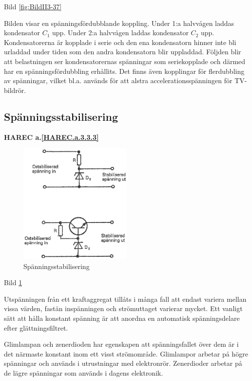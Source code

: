 Bild \ref{fig:BildII3-37}

Bilden visar en spänningsfördubblande koppling. Under 1:a halvvågen
laddas kondensator \(C_1\) upp. Under 2:a halvvågen laddas kondensator
\(C_2\) upp. Kondensatorerna är kopplade i serie och den ena
kondensatorn hinner inte bli urladdad under tiden som den andra
kondensatorn blir uppladdad. Följden blir att belastningen ser
kondensatorernas spänningar som seriekopplade och därmed har en
spänningsfördubbling erhållits. Det finns även kopplingar för
flerdubbling av spänningar, vilket bl.a. används för att alstra
accelerationsspänningen för TV-bildrör.

\subsection{Spänningsstabilisering}
\textbf{HAREC a.\ref{HAREC.a.3.3.3}\label{myHAREC.a.3.3.3}}

\begin{figure}
\includegraphics[width=0.5\textwidth]{images/cropped_pdfs/bild_2_3-38.pdf}
\caption{Spänningsstabilisering}
\label{fig:BildII3-38}
\end{figure}

Bild \ref{fig:BildII3-38}

Utspänningen från ett kraftaggregat tillåts i många fall att endast
variera mellan vissa värden, fastän inspänningen och strömuttaget
varierar mycket. Ett vanligt sätt att hålla konstant spänning är att
anordna en automatisk spänningsdelare efter glättningsfiltret.

Glimlampan och zenerdioden har egenskapen att spänningsfallet över dem
är i det närmaste konstant inom ett visst strömområde. Glimlampor
arbetar på högre spänningar och används i utrustningar med
elektronrör. Zenerdioder arbetar på de lägre spänningar som används i
dagens elektronik.

